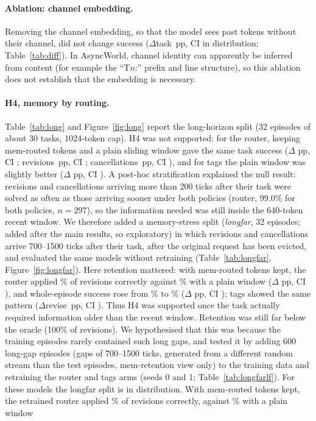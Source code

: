\documentclass[10pt]{article}
\begin{document}
\paragraph{Ablation: channel embedding.} Removing the channel embedding, so that the model sees past tokens without their channel, did not change success ($\Delta$task \drouternoembidtask\,pp, CI \drouternoembidtaskci in distribution; Table~\ref{tab:diff}). In AsyncWorld, channel identity can apparently be inferred from content (for example the ``T$n$:'' prefix and line structure), so this ablation does not establish that the embedding is necessary.

\paragraph{H4, memory by routing.} Table~\ref{tab:long} and Figure~\ref{fig:long} report the long-horizon split (32 episodes of about 30 tasks, 1024-token cap). H4 was not supported: for the router, keeping mem-routed tokens and a plain sliding window gave the same task success ($\Delta$\,\dlongroutertask\,pp, CI \dlongroutertaskci; revisions \dlongrouterrevise\,pp, CI \dlongrouterreviseci; cancellations \dlongroutercancel\,pp, CI \dlongroutercancelci), and for tags the plain window was slightly better ($\Delta$\,\dlongtagstask\,pp, CI \dlongtagstaskci). A post-hoc stratification explained the null result: revisions and cancellations arriving more than 200 ticks after their task were solved as often as those arriving sooner under both policies (router, 99.0\% for both policies, $n=297$), so the information needed was still inside the 640-token recent window. We therefore added a memory-stress split (\emph{longfar}, 32 episodes; added after the main results, so exploratory) in which revisions and cancellations arrive 700--1500 ticks after their task, after the original request has been evicted, and evaluated the same models without retraining (Table~\ref{tab:longfar}, Figure~\ref{fig:longfar}). Here retention mattered: with mem-routed tokens kept, the router applied \longfarroutermemrevise\% of revisions correctly against \longfarrouterplainrevise\% with a plain window ($\Delta$\,\dlongfarrouterrevise\,pp, CI \dlongfarrouterreviseci), and whole-episode success rose from \longfarrouterplainepisode\% to \longfarroutermemepisode\% ($\Delta$\,\dlongfarrouterepisode\,pp, CI \dlongfarrouterepisodeci); tags showed the same pattern ($\Delta$revise \dlongfartagsrevise\,pp, CI \dlongfartagsreviseci). Thus H4 was supported once the task actually required information older than the recent window. Retention was still far below the oracle (100\% of revisions). We hypothesised that this was because the training episodes rarely contained such long gaps, and tested it by adding 600 long-gap episodes (gaps of 700--1500 ticks, generated from a different random stream than the test episodes, mem-retention view only) to the training data and retraining the router and tags arms (seeds 0 and 1; Table~\ref{tab:longfarlf}). For these models the longfar split is in distribution. With mem-routed tokens kept, the retrained router applied \longfarlfroutermemrevise\% of revisions correctly, against \longfarlfrouterplainrevise\% with a plain window 
\end{document}
